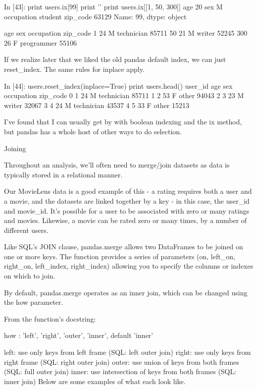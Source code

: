 In [43]:
print users.ix[99]
print '\n'
print users.ix[[1, 50, 300]]
age                20
sex                 M
occupation    student
zip_code        63129
Name: 99, dtype: object


     age sex  occupation zip_code
1     24   M  technician    85711
50    21   M      writer    52245
300   26   F  programmer    55106

If we realize later that we liked the old pandas default index, we can just reset_index. The same rules for inplace apply.

In [44]:
users.reset_index(inplace=True)
print users.head()
   user_id  age sex  occupation zip_code
0        1   24   M  technician    85711
1        2   53   F       other    94043
2        3   23   M      writer    32067
3        4   24   M  technician    43537
4        5   33   F       other    15213

I've found that I can usually get by with boolean indexing and the ix method, but pandas has a whole host of other ways to do selection.

Joining

Throughout an analysis, we'll often need to merge/join datasets as data is typically stored in a relational manner.

Our MovieLens data is a good example of this - a rating requires both a user and a movie, and the datasets are linked together by a key - in this case, the user_id and movie_id. It's possible for a user to be associated with zero or many ratings and movies. Likewise, a movie can be rated zero or many times, by a number of different users.

Like SQL's JOIN clause, pandas.merge allows two DataFrames to be joined on one or more keys. The function provides a series of parameters (on, left_on, right_on, left_index, right_index) allowing you to specify the columns or indexes on which to join.

By default, pandas.merge operates as an inner join, which can be changed using the how parameter.

From the function's docstring:

how : {'left', 'right', 'outer', 'inner'}, default 'inner'

left: use only keys from left frame (SQL: left outer join)
right: use only keys from right frame (SQL: right outer join)
outer: use union of keys from both frames (SQL: full outer join)
inner: use intersection of keys from both frames (SQL: inner join)
Below are some examples of what each look like.

